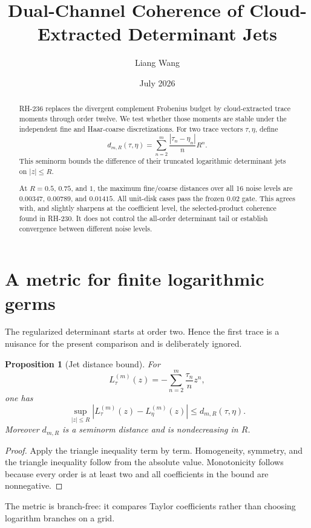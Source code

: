 \documentclass[11pt]{article}
\title{Dual-Channel Coherence of Cloud-Extracted Determinant Jets}
\author{Liang Wang}
\date{July 2026}
\newtheorem{proposition}[theorem]{Proposition}
\theoremstyle{remark}
\begin{document}
\maketitle

\begin{abstract}
RH-236 replaces the divergent complement Frobenius budget by
cloud-extracted trace moments through order twelve.  We test whether those
moments are stable under the independent fine and Haar-coarse
discretizations.  For two trace vectors $\tau,\eta$, define
\[
 d_{m,R}(\tau,\eta)
 =\sum_{n=2}^{m}\frac{|\tau_n-\eta_n|}{n}R^n.
\]
This seminorm bounds the difference of their truncated logarithmic
determinant jets on $|z|\le R$.

At $R=0.5$, $0.75$, and $1$, the maximum fine/coarse distances over all 16
noise levels are $0.00347$, $0.00789$, and $0.01415$.  All unit-disk cases
pass the frozen $0.02$ gate.  This agrees with, and slightly sharpens at the
coefficient level, the selected-product coherence found in RH-230.  It does
not control the all-order determinant tail or establish convergence between
different noise levels.
\end{abstract}

\section{A metric for finite logarithmic germs}

The regularized determinant starts at order two.  Hence the first trace is a
nuisance for the present comparison and is deliberately ignored.

\begin{proposition}[Jet distance bound]\label{prop:distance}
For
\[
 L_\tau^{(m)}(z)=-\sum_{n=2}^m\frac{\tau_n}{n}z^n,
\]
one has
\[
 \sup_{|z|\le R}|L_\tau^{(m)}(z)-L_\eta^{(m)}(z)|
 \le d_{m,R}(\tau,\eta).
\]
Moreover $d_{m,R}$ is a seminorm distance and is nondecreasing in $R$.
\end{proposition}

\begin{proof}
Apply the triangle inequality term by term.  Homogeneity, symmetry, and the
triangle inequality follow from the absolute value.  Monotonicity follows
because every order is at least two and all coefficients in the bound are
nonnegative.
\end{proof}

The metric is branch-free: it compares Taylor coefficients rather than
choosing logarithm branches on a grid.
\end{document}
